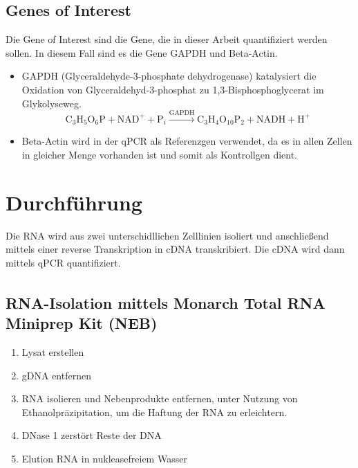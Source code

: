 \documentclass{article}
\begin{document}
\subsection*{Genes of Interest}
Die Gene of Interest sind die Gene, die in dieser Arbeit quantifiziert
werden sollen. In diesem Fall sind es die Gene GAPDH und Beta-Actin.
\begin{itemize}
    \item GAPDH (Glyceraldehyde-3-phosphate dehydrogenase) katalysiert die 
    Oxidation von Glyceraldehyd-3-phosphat zu
    1,3-Bisphosphoglycerat im Glykolyseweg.
\[
\text{C}_3\text{H}_5\text{O}_6\text{P} + \text{NAD}^+ + \text{P}_i \xrightarrow{\text{GAPDH}} \text{C}_3\text{H}_4\text{O}_{10}\text{P}_2 + \text{NADH} + \text{H}^+
\]

    \item Beta-Actin wird in der qPCR als Referenzgen verwendet, da es in allen
    Zellen in gleicher Menge vorhanden ist und somit als Kontrollgen dient.
    
\end{itemize}


\section{Durchführung}

Die RNA wird aus zwei unterschidllichen Zelllinien isoliert und anschließend mittels einer reverse Transkription in cDNA transkribiert. Die cDNA wird dann mittels qPCR quantifiziert.

\subsection{RNA-Isolation mittels Monarch\textsuperscript{\textregistered} Total RNA Miniprep Kit (NEB)}

\begin{enumerate}
    \item Lysat erstellen
    \item gDNA entfernen
    \item RNA isolieren und Nebenprodukte entfernen, unter Nutzung
    von Ethanolpräzipitation, um die Haftung der RNA zu erleichtern.
    \item DNase 1 zerstört Reste der DNA
    \item Elution RNA in nukleasefreiem Wasser
\end{enumerate}
\end{document}
